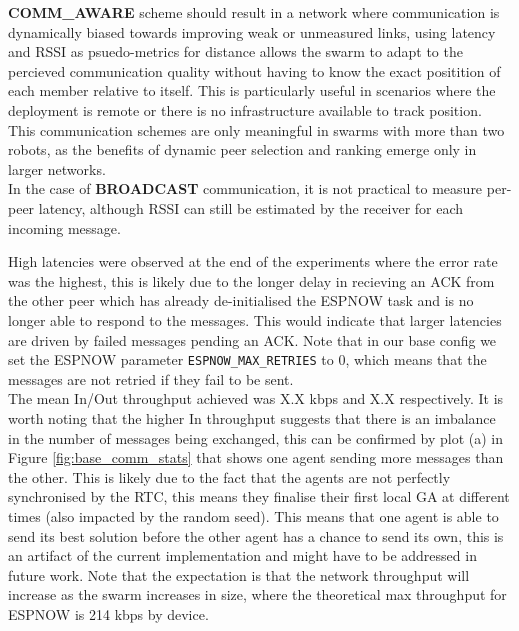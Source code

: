 \documentclass[conference]{IEEEtran}
\begin{document}



\textbf{COMM\_AWARE} scheme should result in a network where communication is dynamically biased towards improving weak or unmeasured links, using latency and RSSI as psuedo-metrics for distance allows the swarm to adapt to the percieved communication quality without having to know the exact positition of each member relative to itself. This is particularly useful in scenarios where the deployment is remote or there is no infrastructure available to track position. This communication schemes are only meaningful in swarms with more than two robots, as the benefits of dynamic peer selection and ranking emerge only in larger networks. \\

In the case of \textbf{BROADCAST} communication, it is not practical to measure per-peer latency, although RSSI can still be estimated by the receiver for each incoming message.

High latencies were observed at the end of the experiments where the error rate was the highest, this is likely due to the longer delay in recieving an ACK from the other peer which has already de-initialised the ESPNOW task and is no longer able to respond to the messages. This would indicate that larger latencies are driven by failed messages pending an ACK. Note that in our base config we set the ESPNOW parameter \texttt{ESPNOW\_MAX\_RETRIES} to 0, which means that the messages are not retried if they fail to be sent.\\

The mean In/Out throughput achieved was X.X kbps and X.X respectively. It is worth noting that the higher In throughput suggests that there is an imbalance in the number of messages being exchanged, this can be confirmed by plot (a) in Figure \ref{fig:base_comm_stats} that shows one agent sending more messages than the other. This is likely due to the fact that the agents are not perfectly synchronised by the RTC, this means they finalise their first local GA at different times (also impacted by the random seed). This means that one agent is able to send its best solution before the other agent has a chance to send its own, this is an artifact of the current implementation and might have to be addressed in future work. Note that the expectation is that the network throughput will increase as the swarm increases in size, where the theoretical max throughput for ESPNOW is 214 kbps by device.\\ 
\end{document}
